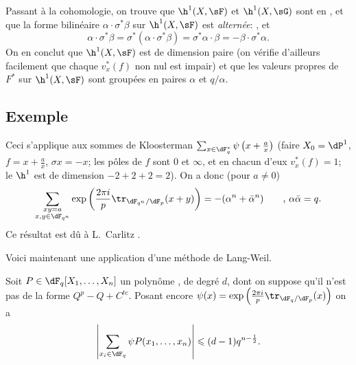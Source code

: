 Passant à la cohomologie, on trouve que $\h^1(X,\sF)$ et $\h^1(X,\sG)$ sont en 
, et que la forme bilinéaire 
$\alpha\cdot \sigma^\ast\beta$ sur $\h^1(X,\sF)$ est \emph{alternée}: 
, et 
\[
  \alpha\cdot \sigma^\ast \beta = \sigma^\ast(\alpha\cdot \sigma^\ast \beta) = \sigma^\ast \alpha\cdot \beta = -\beta\cdot \sigma^\ast \alpha \text{.} 
\]
On en conclut que $\h^1(X,\sF)$ est de dimension paire (on vérifie d'ailleurs 
facilement que chaque $v_x^\ast(f)$ non nul est impair) et que les valeurs 
propres de $F^\ast$ sur $\h^1(X,\sF)$ sont groupées en paires $\alpha$ et 
$q/\alpha$. 






\subsection{Exemple}\label{VI:3-7}

Ceci s'applique aux sommes de Kloosterman 
$\sum_{x\in \dF_q^\ast} \psi\left(x+\frac a x\right)$ (faire 
$X_0=\dP^1$, $f=x+\frac a x$, $\sigma x=-x$; les pôles de $f$ sont $0$ et 
$\infty$, et en chacun d'eux $v_x^\ast(f)=1$; le $\h^1$ est de dimension 
$-2+2+2=2$). On a donc (pour $a\ne 0$) 
\[
  \sum_{\substack{x y=a \\ x,y\in \dF_{q^n}}} \exp\left(\frac{2\pi i}{p} \tr_{\dF_{q^n}/\dF_p}(x+y)\right) = -(\alpha^n+\bar\alpha^n) \qquad \text{, }\alpha\bar \alpha = q \text{.} 
\]
Ce résultat est dû à L.\ Carlitz . 

Voici maintenant une application d'une méthode de Lang-Weil. 





\begin{proposition_}\label{VI:3-8}
Soit $P\in \dF_q[X_1,\dots,X_n]$ un polynôme , de degré 
$d$, dont on suppose qu'il n'est pas de la forme $Q^p-Q+C^{te}$. Posant encore 
$\psi(x) = \exp\left(\frac{2\pi i}{p} \tr_{\dF_q/\dF_p}(x)\right)$ on a 
\[
  \left|\sum_{x_i\in \dF_q} \psi P(x_1,\dots,x_n)\right| \leqslant (d-1) q^{n-\frac 1 2} \text{.}
\]
\end{proposition_}

